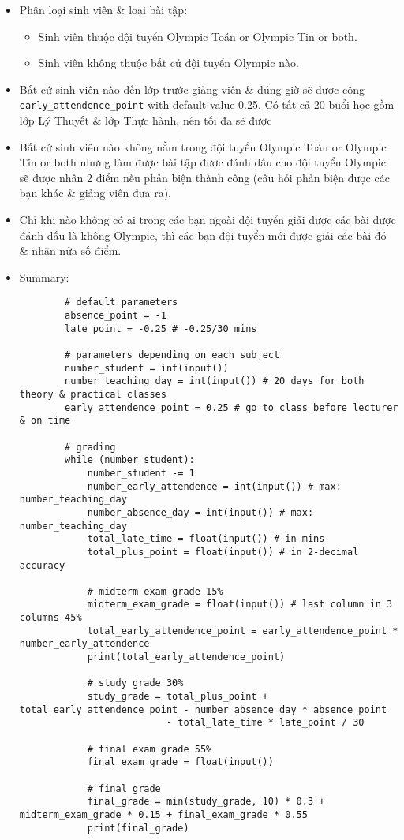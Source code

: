 \documentclass{article}
\begin{document}
\begin{itemize}
	\item Phân loại sinh viên \& loại bài tập:
	\begin{itemize}
		\item Sinh viên thuộc đội tuyển Olympic Toán or Olympic Tin or both.
		\item Sinh viên không thuộc bất cứ đội tuyển Olympic nào.
	\end{itemize}
	\item Bất cứ sinh viên nào đến lớp trước giảng viên \& đúng giờ sẽ được cộng \verb|early_attendence_point| with default value 0.25. Có tất cả 20 buổi học gồm lớp Lý Thuyết \& lớp Thực hành, nên tối đa sẽ được 
	\item Bất cứ sinh viên nào không nằm trong đội tuyển Olympic Toán or Olympic Tin or both nhưng làm được bài tập được đánh dấu cho đội tuyển Olympic sẽ được nhân 2 điểm nếu phản biện thành công (câu hỏi phản biện được các bạn khác \& giảng viên đưa ra).
	\item Chỉ khi nào không có ai trong các bạn ngoài đội tuyển giải được các bài được đánh dấu là không Olympic, thì các bạn đội tuyển mới được giải các bài đó \& nhận nửa số điểm.	
	\item Summary:
	\begin{verbatim}
		# default parameters
		absence_point = -1
		late_point = -0.25 # -0.25/30 mins
		
		# parameters depending on each subject
		number_student = int(input())
		number_teaching_day = int(input()) # 20 days for both theory & practical classes
		early_attendence_point = 0.25 # go to class before lecturer & on time
		
		# grading
		while (number_student):
		    number_student -= 1
		    number_early_attendence = int(input()) # max: number_teaching_day
		    number_absence_day = int(input()) # max: number_teaching_day
		    total_late_time = float(input()) # in mins
		    total_plus_point = float(input()) # in 2-decimal accuracy
		    
		    # midterm exam grade 15%
		    midterm_exam_grade = float(input()) # last column in 3 columns 45%
		    total_early_attendence_point = early_attendence_point * number_early_attendence
		    print(total_early_attendence_point)
		
		    # study grade 30%
		    study_grade = total_plus_point + total_early_attendence_point - number_absence_day * absence_point
		                  - total_late_time * late_point / 30
		
		    # final exam grade 55%
		    final_exam_grade = float(input())
		
		    # final grade
		    final_grade = min(study_grade, 10) * 0.3 + midterm_exam_grade * 0.15 + final_exam_grade * 0.55
		    print(final_grade)
	\end{verbatim}
\end{itemize}
\end{document}
